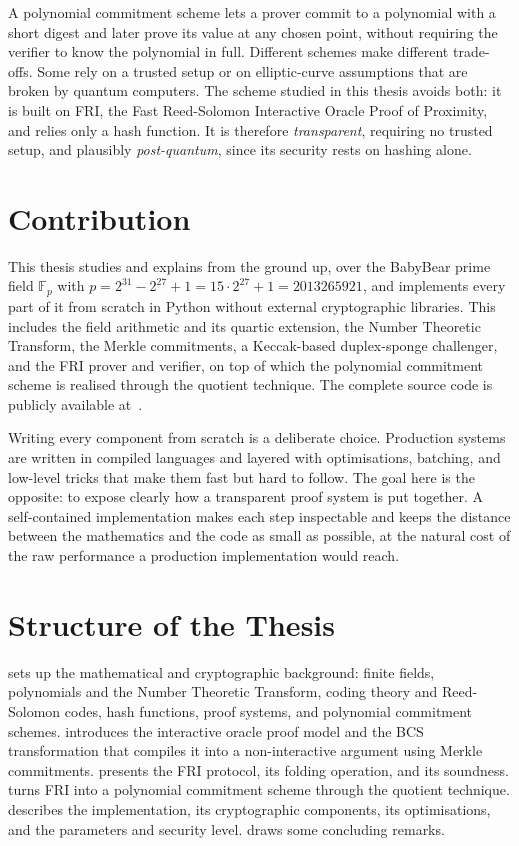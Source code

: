 A polynomial commitment scheme lets a prover commit to a polynomial with a 
short digest and later prove its value at any chosen point, without requiring
the verifier to know the polynomial in full. Different schemes make different
trade-offs. Some rely on a trusted setup or on elliptic-curve
assumptions that are broken by quantum computers. The scheme studied in
this thesis avoids both: it is built on FRI, the Fast Reed-Solomon
Interactive Oracle Proof of Proximity, and relies only a hash function.
It is therefore \emph{transparent}, requiring no trusted setup, and
plausibly \emph{post-quantum}, since its security rests on hashing alone.

\section{Contribution}
\label{sec:contribution}

This thesis studies and explains from the ground up, over the BabyBear
prime field $\mathbb{F}_p$ with $p = 2^{31} - 2^{27} + 1 = 15 \cdot 2^{27} + 1 = 2013265921$,
and implements every part of it from scratch in Python
without external cryptographic libraries. This includes the field
arithmetic and its quartic extension, the Number Theoretic Transform,
the Merkle commitments, a Keccak-based duplex-sponge challenger, and the
FRI prover and verifier, on top of which the polynomial commitment
scheme is realised through the quotient technique. The complete source code
is publicly available at~\cite{thesisrepo}.

Writing every component from scratch is a deliberate choice. Production
systems are written in compiled languages and layered with
optimisations, batching, and low-level tricks that make them fast but
hard to follow. The goal here is the opposite: to expose clearly how a
transparent proof system is put together. A self-contained implementation
makes each step inspectable and keeps the distance between the
mathematics and the code as small as possible, at the natural cost of the
raw performance a production implementation would reach.

\section{Structure of the Thesis}
\label{sec:structure}

 sets up the mathematical and cryptographic
background: finite fields, polynomials and the Number Theoretic
Transform, coding theory and Reed-Solomon codes, hash functions, proof
systems, and polynomial commitment schemes.  introduces the
interactive oracle proof model and the BCS transformation that compiles
it into a non-interactive argument using Merkle commitments.
 presents the FRI protocol, its folding operation, and its
soundness.  turns FRI into a polynomial commitment scheme
through the quotient technique.  describes the
implementation, its cryptographic components, its optimisations, and the
parameters and security level.  draws some concluding 
remarks.